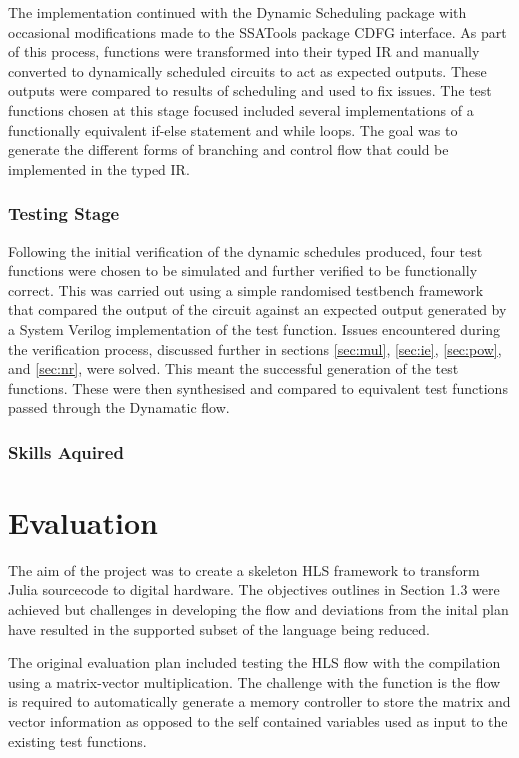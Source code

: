 The implementation continued with the Dynamic Scheduling package with occasional modifications made to the SSATools package CDFG interface. As part of this process, functions were transformed into their typed IR and manually converted to dynamically scheduled circuits to act as expected outputs. These outputs were compared to results of scheduling and used to fix issues. The test functions chosen at this stage focused included several implementations of a functionally equivalent if-else statement and while loops. The goal was to generate the different forms of branching and control flow that could be implemented in the typed IR.

\subsubsection{Testing Stage}
Following the initial verification of the dynamic schedules produced, four test functions were chosen to be simulated and further verified to be functionally correct. This was carried out using a simple randomised testbench framework that compared the output of the circuit against an expected output generated by a System Verilog implementation of the test function. Issues encountered during the verification process, discussed further in sections \ref{sec:mul}, \ref{sec:ie}, \ref{sec:pow}, and \ref{sec:nr}, were solved. This meant the successful generation of the test functions. These were then synthesised and compared to equivalent test functions passed through the Dynamatic flow.

\subsubsection{Skills Aquired} %

\section{Evaluation}
The aim of the project was to create a skeleton HLS framework to transform Julia sourcecode to digital hardware. The objectives outlines in Section 1.3 were achieved but challenges in developing the flow and deviations from the inital plan have resulted in the supported subset of the language being reduced.

The original evaluation plan included testing the HLS flow with the compilation using a matrix-vector multiplication. The challenge with the function is the flow is required to automatically generate a memory controller to store the matrix and vector information as opposed to the self contained variables used as input to the existing test functions.

